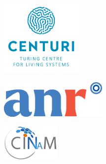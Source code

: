 \begin{center} %
	\begin{minipage}[c]{.25\linewidth}
		\centering\includegraphics[height=10em]{logo/logo-CENTURI.png} 
	\end{minipage}\hfill
	\begin{minipage}[c]{.25\linewidth}
		\centering\includegraphics[height=5em]{logo/ANR-logo-2021-sigle.eps}
	\end{minipage}\hfill
	\begin{minipage}[c]{.25\linewidth}
		\centering\includegraphics[height=5em]{logo/logo-cinam.png} 
	\end{minipage}\hfill
	\begin{minipage}[c]{.25\linewidth}
	\end{minipage}\hfill
\end{center}

\restoregeometry
